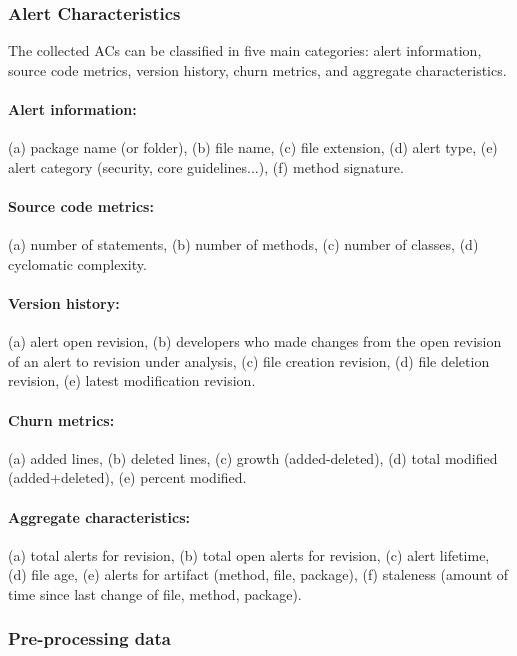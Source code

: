 \documentclass{article}
\begin{document}
\subsubsection{Alert Characteristics}

The collected ACs can be classified in five main categories: alert information, source code metrics, version history, churn metrics, and aggregate characteristics.

\paragraph{Alert information:} (a) package name (or folder), (b) file name, (c) file extension, (d) alert type, (e) alert category (security, core guidelines...), (f) method signature.

\paragraph{Source code metrics:} (a) number of statements, (b) number of methods, (c) number of classes, (d) cyclomatic complexity.

\paragraph{Version history:} (a) alert open revision, (b) developers who made changes from the open revision of an alert to revision under analysis, (c) file creation revision, (d) file deletion revision, (e) latest modification revision.

\paragraph{Churn metrics:} (a) added lines, (b) deleted lines, (c) growth (added-deleted), (d) total modified (added+deleted), (e) percent modified.

\paragraph{Aggregate characteristics:} (a) total alerts for revision, (b) total open alerts for revision, (c) alert lifetime, (d) file age, (e) alerts for artifact (method, file, package), (f) staleness (amount of time since last change of file, method, package).


\subsubsection{Pre-processing data}
\end{document}
